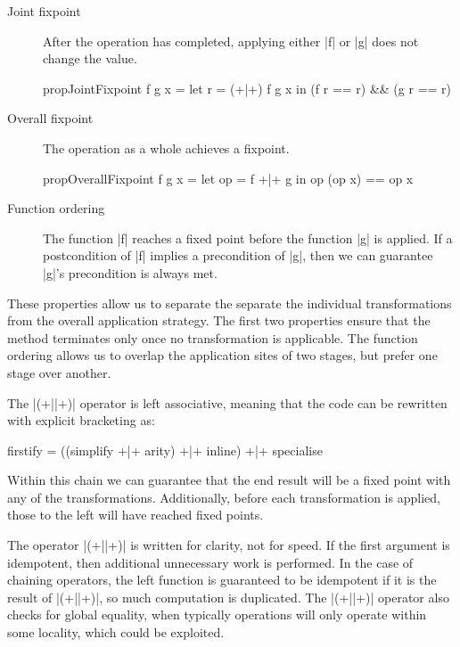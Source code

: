 \documentclass[preprint]{sigplanconf}
\begin{document}
\begin{description}
\item[Joint fixpoint] After the operation has completed, applying either |f| or |g| does not change the value.

\begin{code}
propJointFixpoint f g x = let r = (+|+) f g x in (f r == r) && (g r == r)
\end{code}

\item[Overall fixpoint] The operation as a whole achieves a fixpoint. 

\begin{code}
propOverallFixpoint f g x = let op = f +|+ g in op (op x) == op x
\end{code}

\item[Function ordering] The function |f| reaches a fixed point before the function |g| is applied. If a postcondition of |f| implies a precondition of |g|, then we can guarantee |g|'s precondition is always met.
\end{description}

These properties allow us to separate the separate the individual transformations from the overall application strategy. The first two properties ensure that the method terminates only once no transformation is applicable. The function ordering allows us to overlap the application sites of two stages, but prefer one stage over another.

The |(+||+)| operator is left associative, meaning that the code can be rewritten with explicit bracketing as:

\begin{code}
firstify = ((simplify +|+ arity) +|+ inline) +|+ specialise
\end{code}

Within this chain we can guarantee that the end result will be a fixed point with any of the transformations. Additionally, before each transformation is applied, those to the left will have reached fixed points.

The operator |(+||+)| is written for clarity, not for speed. If the first argument is idempotent, then additional unnecessary work is performed. In the case of chaining operators, the left function is guaranteed to be idempotent if it is the result of |(+||+)|, so much computation is duplicated. The |(+||+)| operator also checks for global equality, when typically operations will only operate within some locality, which could be exploited.
\end{document}
